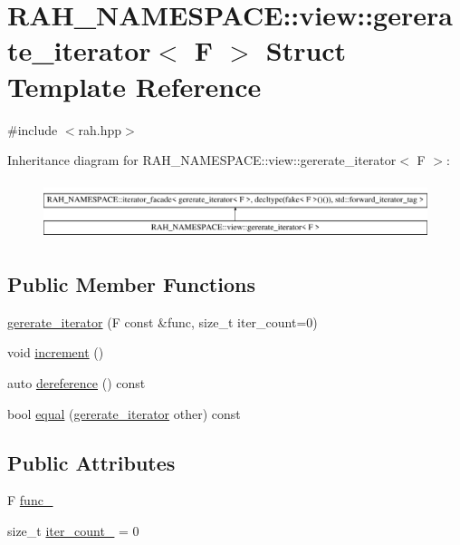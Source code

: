\hypertarget{struct_r_a_h___n_a_m_e_s_p_a_c_e_1_1view_1_1gererate__iterator}{}\section{R\+A\+H\+\_\+\+N\+A\+M\+E\+S\+P\+A\+CE\+::view\+::gererate\+\_\+iterator$<$ F $>$ Struct Template Reference}
\label{struct_r_a_h___n_a_m_e_s_p_a_c_e_1_1view_1_1gererate__iterator}


{\ttfamily \#include $<$rah.\+hpp$>$}

Inheritance diagram for R\+A\+H\+\_\+\+N\+A\+M\+E\+S\+P\+A\+CE\+::view\+::gererate\+\_\+iterator$<$ F $>$\+:\begin{figure}[H]
\begin{center}
\leavevmode
\includegraphics[height=1.702128cm]{struct_r_a_h___n_a_m_e_s_p_a_c_e_1_1view_1_1gererate__iterator}
\end{center}
\end{figure}
\subsection*{Public Member Functions}
\begin{DoxyCompactItemize}
\item 
\mbox{\hyperlink{struct_r_a_h___n_a_m_e_s_p_a_c_e_1_1view_1_1gererate__iterator_ac3dfab3685227633f4f80802e5c81e8e}{gererate\+\_\+iterator}} (F const \&func, size\+\_\+t iter\+\_\+count=0)
\item 
void \mbox{\hyperlink{struct_r_a_h___n_a_m_e_s_p_a_c_e_1_1view_1_1gererate__iterator_acca8608ec371b7896af8df15127496fc}{increment}} ()
\item 
auto \mbox{\hyperlink{struct_r_a_h___n_a_m_e_s_p_a_c_e_1_1view_1_1gererate__iterator_ad68f1e87c422d156a4f8273fec7d51d4}{dereference}} () const
\item 
bool \mbox{\hyperlink{struct_r_a_h___n_a_m_e_s_p_a_c_e_1_1view_1_1gererate__iterator_a32ab267b423d43bd1baf21a57ff2949d}{equal}} (\mbox{\hyperlink{struct_r_a_h___n_a_m_e_s_p_a_c_e_1_1view_1_1gererate__iterator}{gererate\+\_\+iterator}} other) const
\end{DoxyCompactItemize}
\subsection*{Public Attributes}
\begin{DoxyCompactItemize}
\item 
F \mbox{\hyperlink{struct_r_a_h___n_a_m_e_s_p_a_c_e_1_1view_1_1gererate__iterator_ab5ab182d996393a241875b31c7b0bf54}{func\+\_\+}}
\item 
size\+\_\+t \mbox{\hyperlink{struct_r_a_h___n_a_m_e_s_p_a_c_e_1_1view_1_1gererate__iterator_a869a72697b13c3f8a2a54aa99c094952}{iter\+\_\+count\+\_\+}} = 0
\end{DoxyCompactItemize}


